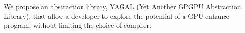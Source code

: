 
We propose an abstraction library, YAGAL (Yet Another GPGPU Abstraction Library), that allow a developer to explore the potential of a GPU enhance program, without limiting the choice of compiler.